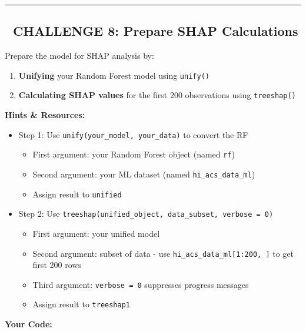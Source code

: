 \documentclass[
  letterpaper,
  DIV=11,
  numbers=noendperiod]{scrartcl}
\providecommand{\tightlist}{%
  \setlength{\itemsep}{0pt}\setlength{\parskip}{0pt}}\usepackage{longtable,booktabs,array}
\begin{document}
\begin{center}\rule{0.5\linewidth}{0.5pt}\end{center}

\subsection{🎯 CHALLENGE 8: Prepare SHAP
Calculations}\label{challenge-8-prepare-shap-calculations}

\begin{tcolorbox}[enhanced jigsaw, title=\textcolor{quarto-callout-warning-color}{\faExclamationTriangle}\hspace{0.5em}{Your Task}, titlerule=0mm, coltitle=black, colbacktitle=quarto-callout-warning-color!10!white, colback=white, left=2mm, toprule=.15mm, opacitybacktitle=0.6, toptitle=1mm, colframe=quarto-callout-warning-color-frame, bottomtitle=1mm, arc=.35mm, bottomrule=.15mm, breakable, leftrule=.75mm, opacityback=0, rightrule=.15mm]

Prepare the model for SHAP analysis by:

\begin{enumerate}
\def\labelenumi{\arabic{enumi}.}
\tightlist
\item
  \textbf{Unifying} your Random Forest model using \texttt{unify()}
\item
  \textbf{Calculating SHAP values} for the first 200 observations using
  \texttt{treeshap()}
\end{enumerate}

\textbf{Hints \& Resources:}

\begin{itemize}
\tightlist
\item
  Step 1: Use \texttt{unify(your\_model,\ your\_data)} to convert the RF

  \begin{itemize}
  \tightlist
  \item
    First argument: your Random Forest object (named \texttt{rf})
  \item
    Second argument: your ML dataset (named \texttt{hi\_acs\_data\_ml})
  \item
    Assign result to \texttt{unified}
  \end{itemize}
\item
  Step 2: Use
  \texttt{treeshap(unified\_object,\ data\_subset,\ verbose\ =\ 0)}

  \begin{itemize}
  \tightlist
  \item
    First argument: your unified model
  \item
    Second argument: subset of data - use
    \texttt{hi\_acs\_data\_ml{[}1:200,\ {]}} to get first 200 rows
  \item
    Third argument: \texttt{verbose\ =\ 0} suppresses progress messages
  \item
    Assign result to \texttt{treeshap1}
  \end{itemize}
\end{itemize}

\textbf{Your Code:}

\end{tcolorbox}
\end{document}
